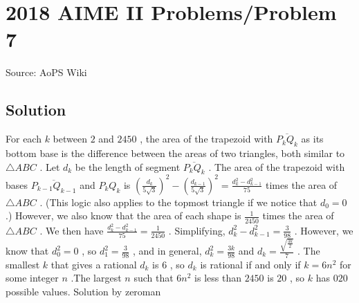 \documentclass[12pt]{article}
\begin{document}
\section*{{2018 AIME II Problems/Problem 7}}
Source: AoPS Wiki

\subsection*{Solution}
For each $k$ between $2$ and $2450$ , the area of the trapezoid with $\overline{P_kQ_k}$ as its bottom base is the difference between the areas of two triangles, both similar to $\triangle{ABC}$ . Let $d_k$ be the length of segment $\overline{P_kQ_k}$ . The area of the trapezoid with bases $\overline{P_{k-1}Q_{k-1}}$ and $P_kQ_k$ is $\left(\frac{d_k}{5\sqrt{3}}\right)^2 - \left(\frac{d_{k-1}}{5\sqrt{3}}\right)^2 = \frac{d_k^2-d_{k-1}^2}{75}$ times the area of $\triangle{ABC}$ . (This logic also applies to the topmost triangle if we notice that $d_0 = 0$ .) However, we also know that the area of each shape is $\frac{1}{2450}$ times the area of $\triangle{ABC}$ . We then have $\frac{d_k^2-d_{k-1}^2}{75} = \frac{1}{2450}$ . Simplifying, $d_k^2-d_{k-1}^2 = \frac{3}{98}$ . However, we know that $d_0^2 = 0$ , so $d_1^2 = \frac{3}{98}$ , and in general, $d_k^2 = \frac{3k}{98}$ and $d_k = \frac{\sqrt{\frac{3k}{2}}}{7}$ . The smallest $k$ that gives a rational $d_k$ is $6$ , so $d_k$ is rational if and only if $k = 6n^2$ for some integer $n$ .The largest $n$ such that $6n^2$ is less than $2450$ is $20$ , so $k$ has $\boxed{020}$ possible values. Solution by zeroman
\end{document}
